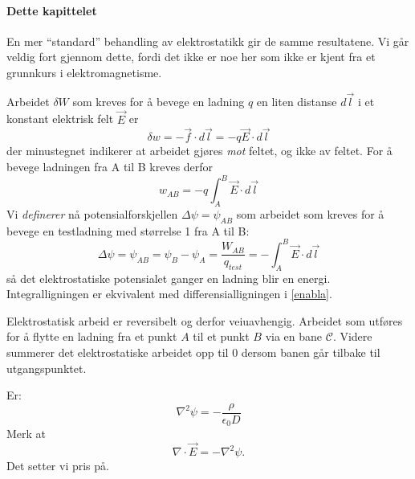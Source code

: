 \paragraph{Dette kapittelet}
En mer ``standard'' behandling av elektrostatikk gir de samme resultatene. Vi går veldig fort gjennom dette, fordi det ikke er noe her som ikke er kjent fra et grunnkurs i elektromagnetisme.

Arbeidet $\delta W$ som kreves for å bevege en ladning $q$ en liten distanse $d\vec{l}$ i et konstant elektrisk felt $\vec{E}$ er 
\begin{equation}
	\delta w = -\vec{f}\cdot d\vec{l}=-q\vec{E}\cdot d\vec{l}
\end{equation}
der minustegnet indikerer at arbeidet gjøres \emph{mot} feltet, og ikke av feltet.
For å bevege ladningen fra A til B kreves derfor
\begin{equation}
	w_{AB}=-q\int_{A}^B \vec{E}\cdot d\vec{l}
\end{equation}
Vi \emph{definerer} nå potensialforskjellen $\Delta \psi = \psi_{AB}$ som arbeidet som kreves for å bevege en testladning med størrelse 1 fra A til B:
\begin{equation}
	\Delta \psi = \psi_{AB}=\psi_B-\psi_A=\frac{W_{AB}}{q_{test}}=-\int_A^B\vec{E}\cdot d\vec{l}
\end{equation}
så det elektrostatiske potensialet ganger en ladning blir en energi.
Integralligningen er ekvivalent med differensialligningen i \eqref{enabla}.

Elektrostatisk arbeid er reversibelt og derfor veiuavhengig. Arbeidet som utføres for å flytte en ladning fra et punkt $A$ til et punkt $B$ via en bane $\mathscr{C}$. Videre summerer det elektrostatiske arbeidet opp til 0 dersom banen går tilbake til utgangspunktet.

Er:
\begin{equation}
	\nabla^2\psi=-\frac{\rho}{\epsilon_0D}
\end{equation}
Merk at
\begin{equation}
	\nabla\cdot\vec{E}=-\nabla^2\psi.
\end{equation}
Det setter vi pris på.
